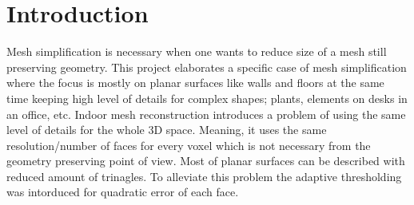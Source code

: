 \chapter{Introduction}
\setcounter{page}{1}%
\thispagestyle{empty}

Mesh simplification is necessary when one wants to reduce size of a mesh still preserving geometry. This project elaborates a specific case of mesh simplification where the focus is mostly on planar surfaces like walls and floors at the same time keeping high level of details for complex shapes; plants, elements on desks in an office, etc. Indoor mesh reconstruction introduces a problem of using the same level of details for the whole 3D space. Meaning, it uses the same resolution/number of faces for every voxel which is not necessary from the geometry preserving point of view. Most of planar surfaces can be described with reduced amount of trinagles. To alleviate this problem the adaptive thresholding was intorduced for quadratic error of each face.